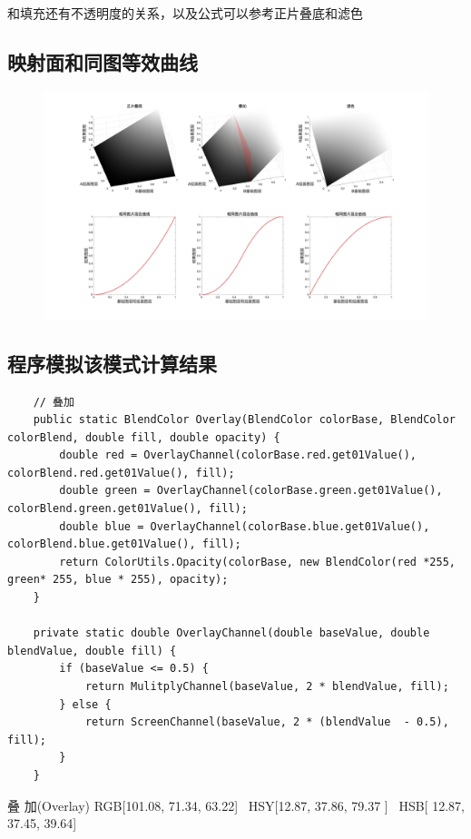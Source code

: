 和填充还有不透明度的关系，以及公式可以参考正片叠底和滤色

\subsection{ 映射面和同图等效曲线}
\begin{figure}[h!]
	\centering
	\includegraphics[width=\linewidth]{figure/叠加.jpg}
	\caption{}
	\label{fig:}
\end{figure}


\subsection{ 程序模拟该模式计算结果}

\begin{lstlisting}
	// 叠加
	public static BlendColor Overlay(BlendColor colorBase, BlendColor colorBlend, double fill, double opacity) {
		double red = OverlayChannel(colorBase.red.get01Value(), colorBlend.red.get01Value(), fill);
		double green = OverlayChannel(colorBase.green.get01Value(), colorBlend.green.get01Value(), fill);
		double blue = OverlayChannel(colorBase.blue.get01Value(), colorBlend.blue.get01Value(), fill);
		return ColorUtils.Opacity(colorBase, new BlendColor(red *255, green* 255, blue * 255), opacity);
	}
	
	private static double OverlayChannel(double baseValue, double blendValue, double fill) {
		if (baseValue <= 0.5) {
			return MulitplyChannel(baseValue, 2 * blendValue, fill);
		} else {
			return ScreenChannel(baseValue, 2 * (blendValue  - 0.5), fill);
		}
	}
\end{lstlisting}

\begin{result}
\item 叠    加(Overlay)       RGB[101.08,  71.34,  63.22]~ HSY[12.87,  37.86,  79.37 ]~ HSB[ 12.87,  37.45,  39.64]
\end{result}
